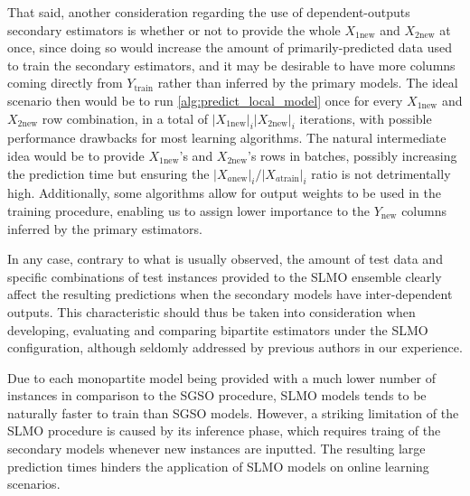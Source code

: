 That said, another consideration regarding the use of dependent-outputs secondary estimators is whether or not to provide the whole $X_{1\text{new}}$ and $X_{2\text{new}}$ at once, since doing so would increase the amount of primarily-predicted data used to train the secondary estimators, and it may be desirable to have more columns coming directly from $Y_\text{train}$ rather than inferred by the primary models. The ideal scenario then would be to run \ref{alg:predict_local_model} once for every $X_{1\text{new}}$ and $X_{2\text{new}}$ row combination, in a total of $|X_{1\text{new}}|_i|X_{2\text{new}}|_i$ iterations, with possible performance drawbacks for most learning algorithms. The natural intermediate idea would be to provide $X_{1\text{new}}$'s and $X_{2\text{new}}$'s rows in batches, possibly increasing the prediction time but ensuring the $|X_{a\text{new}}|_i/|X_{a\text{train}}|_i$ ratio is not detrimentally high. Additionally, some algorithms allow for output weights to be used in the training procedure, enabling us to assign lower importance to the $Y_{\text{new}}$ columns inferred by the primary estimators.

In any case, contrary to what is usually observed, the amount of test data and specific combinations of test instances provided to the SLMO ensemble clearly affect the resulting predictions when the secondary models have inter-dependent outputs. This characteristic should thus be taken into consideration when developing, evaluating and comparing bipartite estimators under the SLMO configuration, although seldomly addressed by previous authors in our experience.%

Due to each monopartite model being provided with a much lower number of instances in comparison to the SGSO procedure, SLMO models tends to be naturally faster to train than SGSO models. However, a striking limitation of the SLMO procedure is caused by its inference phase, which requires traing of the secondary models whenever new instances are inputted. The resulting large prediction times hinders the application of SLMO models on online learning scenarios.




